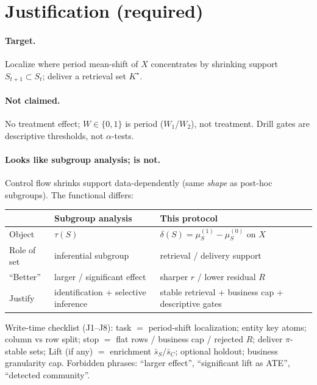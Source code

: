 \documentclass[11pt]{article}
\begin{document}
\section{Justification (required)}
\label{sec:justify}

\paragraph{Target.}
Localize where period mean-shift of $X$ concentrates by shrinking
support $S_{t+1}\subset S_t$; deliver a retrieval set $K^\star$.

\paragraph{Not claimed.}
No treatment effect; $W\in\{0,1\}$ is period ($W_1$/$W_2$), not
treatment. Drill gates are descriptive thresholds, not $\alpha$-tests.

\paragraph{Looks like subgroup analysis; is not.}
Control flow shrinks support data-dependently (same \emph{shape} as
post-hoc subgroups). The functional differs:

\begin{center}
\begin{tabular}{@{}lll@{}}
\toprule
 & Subgroup analysis & This protocol \\
\midrule
Object & $\tau(S)$ & $\delta(S)=\mu_S^{(1)}-\mu_S^{(0)}$ on $X$ \\
Role of set & inferential subgroup & retrieval / delivery support \\
``Better'' & larger / significant effect
  & sharper $r$ / lower residual $R$ \\
Justify & identification + selective inference
  & stable retrieval + business cap + descriptive gates \\
\bottomrule
\end{tabular}
\end{center}

\noindent
Write-time checklist (J1--J8): task $=$ period-shift localization;
entity key atoms; column vs row split; stop $=$ flat rows / business
cap / rejected $R$; deliver $\pi$-stable sets; Lift (if any) $=$
enrichment $\bar s_S/\bar s_C$; optional holdout; business granularity
cap. Forbidden phrases: ``larger effect'', ``significant lift as ATE'',
``detected community''.
\end{document}
